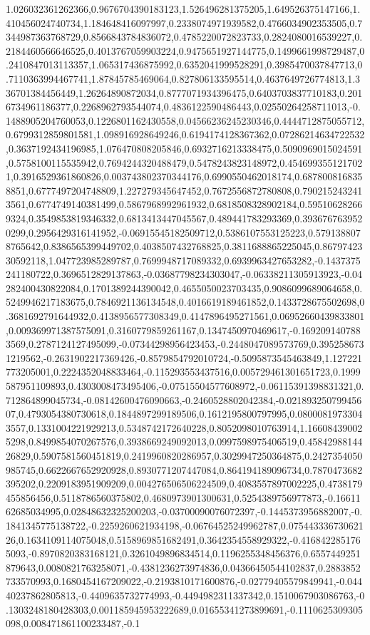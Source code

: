 1.026032361262366,0.9676704390183123,1.526496281375205,1.649526375147166,1.410456024740734,1.184648416097997,0.2338074971939582,0.4766034902353505,0.7344987363768729,0.8566843784836072,0.4785220072823733,0.2824080016539227,0.2184460566646525,0.4013767059903224,0.9475651927144775,0.1499661998729487,0.2410847013113357,1.065317436875992,0.6352041999528291,0.3985470037847713,0.7110363994467741,1.87845785469064,0.827806133595514,0.4637649726774813,1.336701384456449,1.26264890872034,0.8777071934396475,0.6403703837710183,0.2016734961186377,0.2268962793544074,0.4836122590486443,0.02550264258711013,-0.1488905204760053,0.1226801162430558,0.04566236245230346,0.4444712875055712,0.6799312859801581,1.098916928649246,0.6194174128367362,0.07286214634722532,0.3637192434196985,1.076470808205846,0.6932716213338475,0.5090969015024591,0.5758100115535942,0.7694244320488479,0.5478243823148972,0.4546993551217021,0.3916529361860826,0.003743802370344176,0.6990550462018174,0.6878008168358851,0.6777497204748809,1.227279345647452,0.7672556872780808,0.7902152432413561,0.6774749140381499,0.5867968992961932,0.6818508328902184,0.595106282669324,0.3549853819346332,0.6813413447045567,0.489441783293369,0.3936767639520299,0.2956429316141952,-0.06915545182509712,0.5386107553125223,0.5791388078765642,0.8386565399449702,0.4038507432768825,0.3811688865225045,0.8679742330592118,1.047723985289787,0.7699948717089332,0.6939963427653282,-0.1437375241180722,0.3696512829137863,-0.03687798234303047,-0.06338211305913923,-0.04282400430822084,0.1701389244390042,0.4655050023703435,0.9086099689064658,0.5249946217183675,0.7846921136134548,0.4016619189461852,0.1433728675502698,0.3681692791644932,0.4138956577308349,0.4147896495271561,0.06952660439833801,0.009369971387575091,0.3160779859261167,0.1347450970469617,-0.1692091407883569,0.2787124127495099,-0.07344298956423453,-0.2448047089573769,0.3952586731219562,-0.2631902217369426,-0.8579854792010724,-0.5095873545463849,1.127221773205001,0.2224352048833464,-0.115293553437516,0.005729461301651723,0.1999587951109893,0.4303008473495406,-0.07515504577608972,-0.06115391398831321,0.712864899045734,-0.08142600476090663,-0.2460528802042384,-0.02189325079945607,0.4793054380730618,0.1844897299189506,0.1612195800797995,0.08000819733043557,0.1331004221929213,0.5348742172640228,0.8052098010763914,1.166084390025298,0.8499854070267576,0.3938669249092013,0.0997598975406519,0.4584298814426829,0.5907581560451819,0.2419960820286957,0.3029947250364875,0.2427354050985745,0.6622667652920928,0.8930771207447084,0.864194189096734,0.7870473682395202,0.2209183951909209,0.004276506506224509,0.4083557897002225,0.4738179455856456,0.5118786560375802,0.4680973901300631,0.5254389756977873,-0.1661162685034995,0.02848632325200203,-0.03700090076072397,-0.1445373956882007,-0.1841345775138722,-0.2259260621934198,-0.06764525249962787,0.07544333673062126,0.1634109114075048,0.5158969851682491,0.3642354558929322,-0.4168422851765093,-0.8970820383168121,0.3261049896834514,0.1196255348456376,0.6557449251879643,0.0080821763258071,-0.4381236273974836,0.04366450544102837,0.2883852733570993,0.1680454167209022,-0.2193810171600876,-0.02779405579849941,-0.04440237862805813,-0.4409635732774993,-0.4494982311337342,0.1510067903086763,-0.1303248180428303,0.001185945953222689,0.01655341273899691,-0.1110625309305098,0.008471861100233487,-0.1